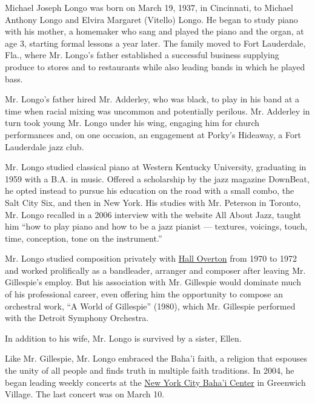 Michael Joseph Longo was born on March 19, 1937, in Cincinnati, to
Michael Anthony Longo and Elvira Margaret (Vitello) Longo. He began to
study piano with his mother, a homemaker who sang and played the piano
and the organ, at age 3, starting formal lessons a year later. The
family moved to Fort Lauderdale, Fla., where Mr. Longo's father
established a successful business supplying produce to stores and to
restaurants while also leading bands in which he played bass.

Mr. Longo's father hired Mr. Adderley, who was black, to play in his
band at a time when racial mixing was uncommon and potentially perilous.
Mr. Adderley in turn took young Mr. Longo under his wing, engaging him
for church performances and, on one occasion, an engagement at Porky's
Hideaway, a Fort Lauderdale jazz club.

Mr. Longo studied classical piano at Western Kentucky University,
graduating in 1959 with a B.A. in music. Offered a scholarship by the
jazz magazine DownBeat, he opted instead to pursue his education on the
road with a small combo, the Salt City Six, and then in New York. His
studies with Mr. Peterson in Toronto, Mr. Longo recalled in a 2006
interview with the website All About Jazz, taught him ``how to play
piano and how to be a jazz pianist --- textures, voicings, touch, time,
conception, tone on the instrument.''

Mr. Longo studied composition privately with
\href{https://www.nytimes.com/1972/11/26/archives/hall-overton-of-juilliard-dead-symphonic-and-jazz-composer.html}{Hall
Overton} from 1970 to 1972 and worked prolifically as a bandleader,
arranger and composer after leaving Mr. Gillespie's employ. But his
association with Mr. Gillespie would dominate much of his professional
career, even offering him the opportunity to compose an orchestral work,
``A World of Gillespie'' (1980), which Mr. Gillespie performed with the
Detroit Symphony Orchestra.

In addition to his wife, Mr. Longo is survived by a sister, Ellen.

Like Mr. Gillespie, Mr. Longo embraced the Baha'i faith, a religion that
espouses the unity of all people and finds truth in multiple faith
traditions. In 2004, he began leading weekly concerts at the
\href{http://bahainyc.org/}{New York City Baha'i Center} in Greenwich
Village. The last concert was on March 10.

\href{https://www.nytimes.com/interactive/2020/obituaries/people-died-coronavirus-obituaries.html?action=click\&pgtype=Article\&state=default\&region=BELOW_MAIN_CONTENT\&context=covid_obits_promo}{}


